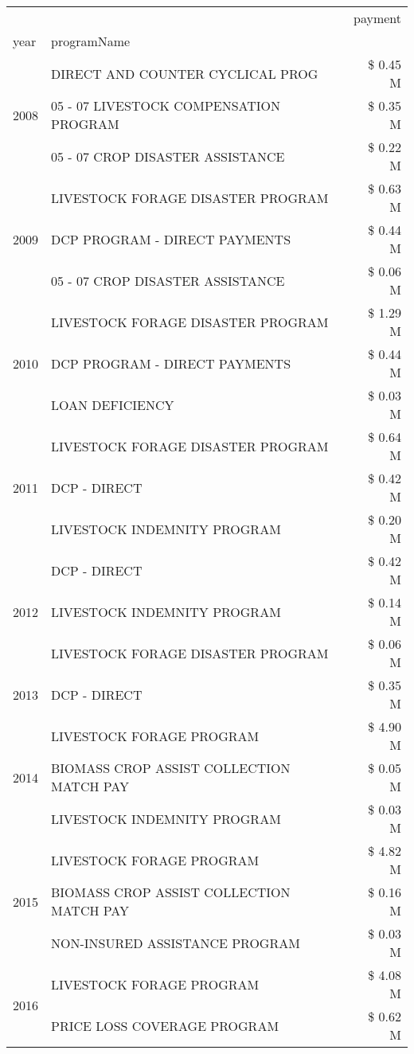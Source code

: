 \begin{tabular}{llr}
\toprule
 &  & payment \\
year & programName &  \\
\midrule
\multirow[t]{3}{*}{2008} & DIRECT AND COUNTER CYCLICAL PROG & \$ 0.45 M \\
 & 05 - 07 LIVESTOCK COMPENSATION PROGRAM & \$ 0.35 M \\
 & 05 - 07 CROP DISASTER ASSISTANCE & \$ 0.22 M \\
\cline{1-3}
\multirow[t]{3}{*}{2009} & LIVESTOCK FORAGE DISASTER  PROGRAM & \$ 0.63 M \\
 & DCP PROGRAM - DIRECT PAYMENTS & \$ 0.44 M \\
 & 05 - 07 CROP DISASTER ASSISTANCE & \$ 0.06 M \\
\cline{1-3}
\multirow[t]{3}{*}{2010} & LIVESTOCK FORAGE DISASTER  PROGRAM & \$ 1.29 M \\
 & DCP PROGRAM - DIRECT PAYMENTS & \$ 0.44 M \\
 & LOAN DEFICIENCY & \$ 0.03 M \\
\cline{1-3}
\multirow[t]{3}{*}{2011} & LIVESTOCK FORAGE DISASTER PROGRAM & \$ 0.64 M \\
 & DCP - DIRECT & \$ 0.42 M \\
 & LIVESTOCK INDEMNITY PROGRAM & \$ 0.20 M \\
\cline{1-3}
\multirow[t]{3}{*}{2012} & DCP - DIRECT & \$ 0.42 M \\
 & LIVESTOCK INDEMNITY PROGRAM & \$ 0.14 M \\
 & LIVESTOCK FORAGE DISASTER PROGRAM & \$ 0.06 M \\
\cline{1-3}
2013 & DCP - DIRECT & \$ 0.35 M \\
\cline{1-3}
\multirow[t]{3}{*}{2014} & LIVESTOCK FORAGE PROGRAM & \$ 4.90 M \\
 & BIOMASS CROP ASSIST COLLECTION MATCH PAY & \$ 0.05 M \\
 & LIVESTOCK INDEMNITY PROGRAM & \$ 0.03 M \\
\cline{1-3}
\multirow[t]{3}{*}{2015} & LIVESTOCK FORAGE PROGRAM & \$ 4.82 M \\
 & BIOMASS CROP ASSIST COLLECTION MATCH PAY & \$ 0.16 M \\
 & NON-INSURED ASSISTANCE PROGRAM & \$ 0.03 M \\
\cline{1-3}
\multirow[t]{3}{*}{2016} & LIVESTOCK FORAGE PROGRAM                      & \$ 4.08 M \\
 & PRICE LOSS COVERAGE PROGRAM                   & \$ 0.62 M \\

\end{tabular}
